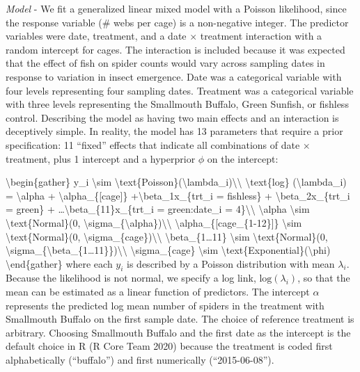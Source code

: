 \documentclass[
  12pt,
]{article}
\begin{document}
\emph{Model} - We fit a generalized linear mixed model with a Poisson
likelihood, since the response variable (\# webs per cage) is a
non-negative integer. The predictor variables were date, treatment, and
a date \(\times\) treatment interaction with a random intercept for
cages. The interaction is included because it was expected that the
effect of fish on spider counts would vary across sampling dates in
response to variation in insect emergence. Date was a categorical
variable with four levels representing four sampling dates. Treatment
was a categorical variable with three levels representing the Smallmouth
Buffalo, Green Sunfish, or fishless control. Describing the model as
having two main effects and an interaction is deceptively simple. In
reality, the model has 13 parameters that require a prior specification:
11 ``fixed'' effects that indicate all combinations of date \(\times\)
treatment, plus 1 intercept and a hyperprior \(\phi\) on the intercept:

\textbackslash begin\{gather\} y\_i \textbackslash sim
\textbackslash text\{Poisson\}(\textbackslash lambda\_i)\textbackslash\textbackslash{}
\textbackslash text\{log\} (\textbackslash lambda\_i) =
\textbackslash alpha + \textbackslash alpha\_\{{[}cage{]}\}
+\textbackslash beta\_1x\_\{trt\_i = fishless\} +
\textbackslash beta\_2x\_\{trt\_i = green\} +
\ldots\textbackslash beta\_\{11\}x\_\{trt\_i = green:date\_i =
4\}\textbackslash\textbackslash{} \textbackslash alpha
\textbackslash sim \textbackslash text\{Normal\}(0,
\textbackslash sigma\_\{\textbackslash alpha\})\textbackslash\textbackslash{}
\textbackslash alpha\_\{{[}cage\_\{1-12\}{]}\} \textbackslash sim
\textbackslash text\{Normal\}(0,
\textbackslash sigma\_\{cage\})\textbackslash\textbackslash{}
\textbackslash beta\_\{1\ldots11\} \textbackslash sim
\textbackslash text\{Normal\}(0,
\textbackslash sigma\_\{\textbackslash beta\_\{1\ldots11\}\})\textbackslash\textbackslash{}
\textbackslash sigma\_\{cage\} \textbackslash sim
\textbackslash text\{Exponential\}(\textbackslash phi)
\textbackslash end\{gather\} where each \(y_i\) is described by a
Poisson distribution with mean \(\lambda_i\). Because the likelihood is
not normal, we specify a log link, \(\text{log}(\lambda_i)\), so that
the mean can be estimated as a linear function of predictors. The
intercept \(\alpha\) represents the predicted log mean number of spiders
in the treatment with Smallmouth Buffalo on the first sample date. The
choice of reference treatment is arbitrary. Choosing Smallmouth Buffalo
and the first date as the intercept is the default choice in R (R Core
Team 2020) because the treatment is coded first alphabetically
(``buffalo'') and first numerically (``2015-06-08'').
\end{document}
